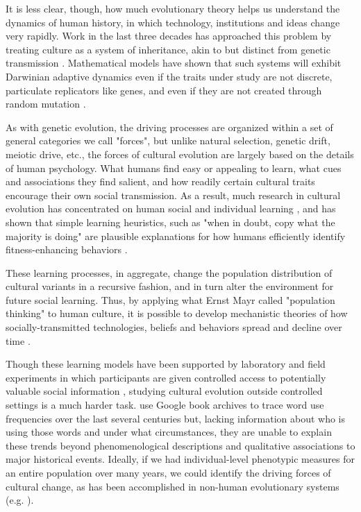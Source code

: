 \documentclass[reqno,12pt]{amsart}
\begin{document}
It is less clear, though, how much evolutionary theory helps us understand the dynamics of human history, in which technology, institutions and ideas change very rapidly. Work in the last three decades has approached this problem by treating culture as a system of inheritance, akin to but distinct from genetic transmission \citep{durham1992coevolution, richerson2005genesalone}. Mathematical models have shown that such systems will exhibit Darwinian adaptive dynamics even if the traits under study are not discrete, particulate replicators like genes, and even if they are not created through random mutation \citep{boyd1985culture, henrich2002replicators}.

As with genetic evolution, the driving processes are organized within a set of general categories we call "forces", but unlike natural selection, genetic drift, meiotic drive, etc., the forces of cultural evolution are largely based on the details of human psychology. What humans find easy or appealing to learn, what cues and associations they find salient, and how readily certain cultural traits encourage their own social transmission. As a result, much research in cultural evolution has concentrated on human social and individual learning \citep{mesoudi2006unified}, and has shown that simple learning heuristics, such as "when in doubt, copy what the majority is doing" are plausible explanations for how humans efficiently identify fitness-enhancing behaviors \citep{mcelreath2008successbias}.

These learning processes, in aggregate, change the population distribution of cultural variants in a recursive fashion, and in turn alter the environment for future social learning. Thus, by applying what Ernst Mayr called "population thinking" to human culture, it is possible to develop mechanistic theories of how socially-transmitted technologies, beliefs and behaviors spread and decline over time \citep{shennan2009pattern}.

Though these learning models have been supported by laboratory and field experiments in which participants are given controlled access to potentially valuable social information \citep{baum2004cultural, caldwell2008studying, efferson2007equality, mesoudi2011payoffbias}, studying cultural evolution outside controlled settings is a much harder task. \citet{michel2011quantitative} use Google book archives to trace word use frequencies over the last several centuries but, lacking information about who is using those words and under what circumstances, they are unable to explain these trends beyond phenomenological descriptions and qualitative associations to major historical events. Ideally, if we had individual-level phenotypic measures for an entire population over many years, we could identify the driving forces of cultural change, as has been accomplished in non-human evolutionary systems (e.g. \citet{grant2002unpredictable, ozgul2009dynamics}).
\end{document}
